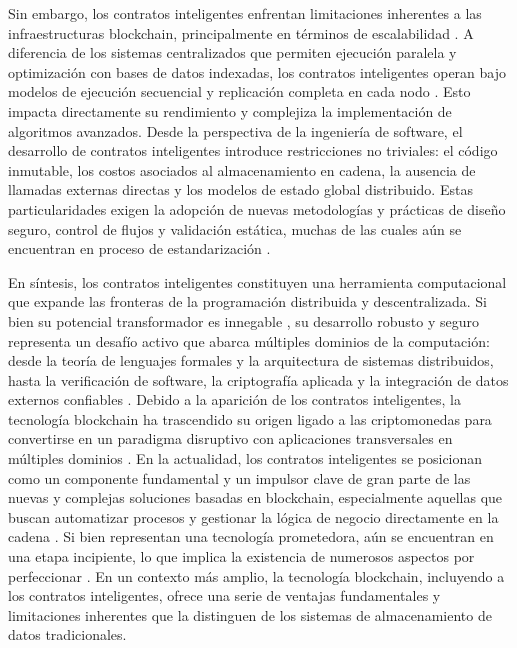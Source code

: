 Sin embargo, los contratos inteligentes enfrentan limitaciones inherentes a las infraestructuras blockchain, principalmente en términos de escalabilidad \cite{kalajdjieski2023databases}. A diferencia de los sistemas centralizados que permiten ejecución paralela y optimización con bases de datos indexadas, los contratos inteligentes operan bajo modelos de ejecución secuencial y replicación completa en cada nodo \cite{taherdoost2023smart}. Esto impacta directamente su rendimiento y complejiza la implementación de algoritmos avanzados. Desde la perspectiva de la ingeniería de software, el desarrollo de contratos inteligentes introduce restricciones no triviales: el código inmutable, los costos asociados al almacenamiento en cadena, la ausencia de llamadas externas directas y los modelos de estado global distribuido. Estas particularidades exigen la adopción de nuevas metodologías y prácticas de diseño seguro, control de flujos y validación estática, muchas de las cuales aún se encuentran en proceso de estandarización \cite{taherdoost2023smart, cepal2021economia}.

En síntesis, los contratos inteligentes constituyen una herramienta computacional que expande las fronteras de la programación distribuida y descentralizada. Si bien su potencial transformador es innegable \cite{taherdoost2023smart}, su desarrollo robusto y seguro representa un desafío activo que abarca múltiples dominios de la computación: desde la teoría de lenguajes formales \cite{hoskinson2017we} y la arquitectura de sistemas distribuidos, hasta la verificación de software, la criptografía aplicada y la integración de datos externos confiables \cite{taherdoost2023smart}. Debido a la aparición de los contratos inteligentes, la tecnología blockchain ha trascendido su origen ligado a las criptomonedas para convertirse en un paradigma disruptivo con aplicaciones transversales en múltiples dominios \cite{bartolomeo2020introduccion, vaigandla2023review}. En la actualidad, los contratos inteligentes se posicionan como un componente fundamental y un impulsor clave de gran parte de las nuevas y complejas soluciones basadas en blockchain, especialmente aquellas que buscan automatizar procesos y gestionar la lógica de negocio directamente en la cadena \cite{sharabati2024blockchain}. Si bien representan una tecnología prometedora, aún se encuentran en una etapa incipiente, lo que implica la existencia de numerosos aspectos por perfeccionar \cite{taherdoost2023smart}. En un contexto más amplio, la tecnología blockchain, incluyendo a los contratos inteligentes, ofrece una serie de ventajas fundamentales y limitaciones inherentes que la distinguen de los sistemas de almacenamiento de datos tradicionales.

